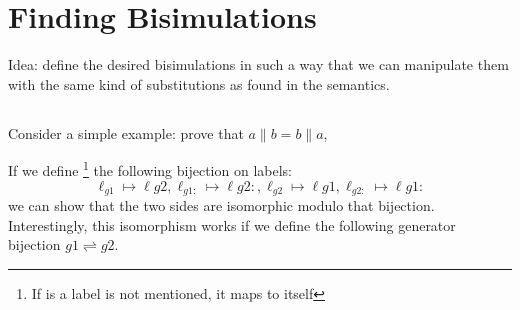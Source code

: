 \section{Finding Bisimulations}\label{sec:bisim}


Idea: define the desired bisimulations in such a way that
we can manipulate them with the same kind of substitutions
as found in the semantics.

\subsection{}

Consider a simple example: prove that $a \parallel b = b \parallel a$,


If we define%
\footnote{If is a label is not mentioned, it maps to itself}
the following bijection on labels:
\[
  \ell_{g1} \mapsto \ell{g2}
, \ell_{g1:} \mapsto \ell{g2:}
, \ell_{g2} \mapsto \ell{g1}
, \ell_{g2:} \mapsto \ell{g1:}
\]
we can show that the two sides are isomorphic modulo that bijection.
Interestingly, this isomorphism works if we define the following
generator bijection $g1 \rightleftharpoons g2$.

